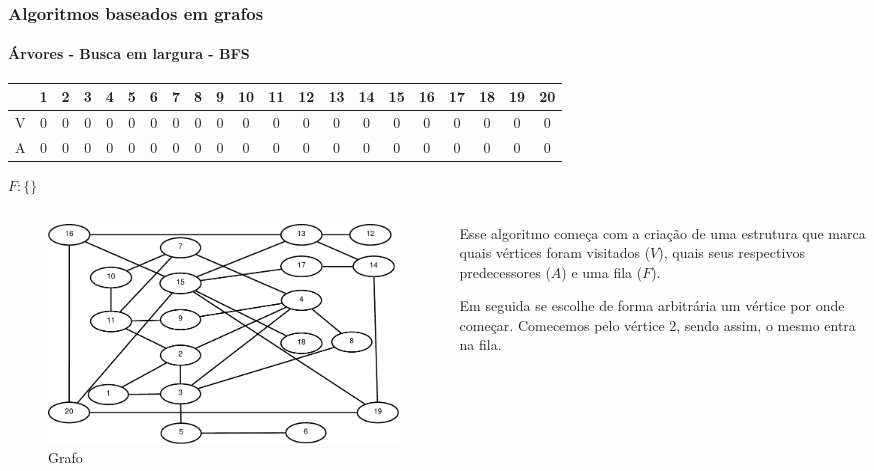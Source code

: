 \begin{frame}
	\frametitle{Algoritmos baseados em grafos}
	\framesubtitle{Árvores - Busca em largura - BFS}
	\setlength{\tabcolsep}{0.5em}
	\begin{tabular}{|c|c|c|c|c|c|c|c|c|c|c|c|c|c|c|c|c|c|c|c|c|}
		\hline
		\rule[0ex]{0pt}{0ex}&1&2&3&4&5&6&7&8&9&10&11&12&13&14&15&16&17&18&19&20 \\
		\hline
		\rule[0ex]{0pt}{0ex}V&0&0&0&0&0&0&0&0&0&0&0&0&0&0&0&0&0&0&0&0 \\
		\hline
		\rule[0ex]{0pt}{0ex}A&0&0&0&0&0&0&0&0&0&0&0&0&0&0&0&0&0&0&0&0 \\
		\hline
	\end{tabular}
	\par $F:\{\}$
	\begin{columns}
		\begin{column}{0.5\textwidth}
			\begin{figure}
				\centering
				\includegraphics[width=\linewidth]{images/buscaEmLargura00}
				\caption{Grafo}
				\label{fig:buscaemlargura01}
			\end{figure}
		\end{column}
		\begin{column}{0.5\textwidth}
			\par Esse algoritmo começa com a criação de uma estrutura que marca quais vértices foram visitados ($V$), quais seus respectivos predecessores ($A$) e uma fila ($F$).
			\par Em seguida se escolhe de forma arbitrária um vértice por onde começar. Comecemos pelo vértice $2$, sendo assim, o mesmo entra na fila.
		\end{column}
	\end{columns}
\end{frame}

